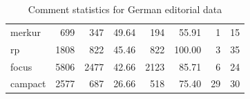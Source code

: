\begin{table}
\begin{tabular}{lrrrrrrr}
		merkur             &            699 &               347 &         49.64 &        194 &         55.91 &             1 &                15 \\
		rp                 &           1808 &               822 &         45.46 &        822 &        100.00 &             3 &                35 \\
		focus              &           5806 &              2477 &         42.66 &       2123 &         85.71 &             6 &                24 \\
		campact            &           2577 &               687 &         26.66 &        518 &         75.40 &            29 &                30 \\ \bottomrule
	\end{tabular}
	\caption{Comment statistics for German editorial data} 
\end{table}


